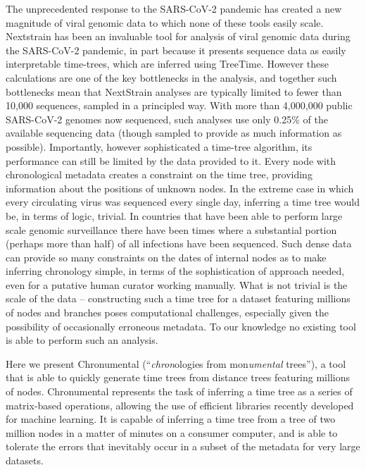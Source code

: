The unprecedented response to the SARS-CoV-2 pandemic has created a new magnitude of viral genomic data to which none of these tools easily scale. Nextstrain \citep{Hadfield2018-fb} has been an invaluable tool for analysis of viral genomic data during the SARS-CoV-2 pandemic, in part because it presents sequence data as easily interpretable time-trees, which are inferred using TreeTime. However these calculations are one of the key bottlenecks in the analysis, and together such bottlenecks mean that NextStrain analyses are typically limited to fewer than 10,000 sequences, sampled in a principled way. With more than 4,000,000 public SARS-CoV-2 genomes now sequenced, such analyses use only 0.25\% of the available sequencing data (though sampled to provide as much information as possible). Importantly, however sophisticated a time-tree algorithm, its performance can still be limited by the data provided to it. Every node with chronological metadata creates a constraint on the time tree, providing information about the positions of unknown nodes. In the extreme case in which every circulating virus was sequenced every single day, inferring a time tree would be, in terms of logic, trivial. In countries that have been able to perform large scale genomic surveillance there have been times where a substantial portion (perhaps more than half) of all infections have been sequenced. Such dense data can provide so many constraints on the dates of internal nodes as to make inferring chronology simple, in terms of the sophistication of approach needed, even for a putative human curator working manually. What is not trivial is the scale of the data -- constructing such a time tree for a dataset featuring millions of nodes and branches poses computational challenges, especially given the possibility of occasionally erroneous metadata. To our knowledge no existing tool is able to perform such an analysis.

Here we present Chronumental (``\textit{chron}ologies from mon\textit{umental} trees''), a tool that is able to quickly generate time trees from distance trees featuring millions of nodes. Chronumental represents the task of inferring a time tree as a series of matrix-based operations, allowing the use of efficient libraries recently developed for machine learning. It is capable of inferring a time tree from a tree of two million nodes in a matter of minutes on a consumer computer, and is able to tolerate the errors that inevitably occur in a subset of the metadata for very large datasets.


